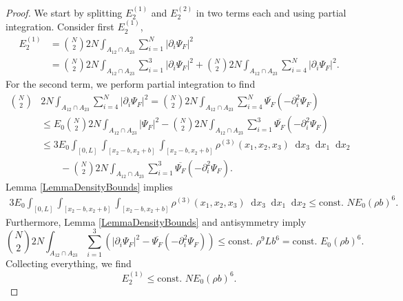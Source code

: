 \documentclass[a4paper,11pt]{article}
\newcommand{\abs}[1]{\left\lvert #1 \right\rvert}
\newcommand*\diff{\mathop{}\!\mathrm{d}}
\numberwithin{equation}{section}
\begin{document}
	\begin{proof}
		We start by splitting $ E_2^{(1)} $ and $ E_2^{(2)} $ in two terms each and using partial integration. Consider first $ E_2^{(1)} $,  
		\begin{equation}
			\begin{aligned}
				E_2^{(1)}&=\binom{N}{2}2N\int_{A_{12}\cap A_{23}}\sum_{i=1}^{N}\abs{\partial_i\Psi_F}^2\\
				&=\binom{N}{2}2N\int_{A_{12}\cap A_{23}}\sum_{i=1}^{3}\abs{\partial_i\Psi_F}^2+\binom{N}{2}2N\int_{A_{12}\cap A_{23}}\sum_{i=4}^{N}\abs{\partial_i\Psi_F}^2.
			\end{aligned}
		\end{equation}
		For the second term, we perform partial integration to find \begin{equation}
			\begin{aligned}
				\binom{N}{2}&2N\int_{A_{12}\cap A_{23}}\sum_{i=4}^{N}\abs{\partial_i\Psi_F}^2=\binom{N}{2}2N\int_{A_{12}\cap A_{23}}\sum_{i=4}^{N}\overline{\Psi_F}(-\partial^2_i\Psi_F)\\
				&\leq E_0 \binom{N}{2}2N\int_{A_{12}\cap A_{23}}\abs{\Psi_F}^2-\binom{N}{2}2N\int_{A_{12}\cap A_{23}}\sum_{i=1}^{3}\overline{\Psi_F}(-\partial^2_i\Psi_F)\\&\leq 3E_0\int_{[0,L]}\int_{[x_2-b,x_2+b]}\int_{[x_2-b,x_2+b]}\rho^{(3)}(x_1,x_2,x_3)\diff x_3\diff x_1\diff x_2\\
				&\qquad  -\binom{N}{2}2N\int_{A_{12}\cap A_{23}}\sum_{i=1}^{3}\overline{\Psi_F}(-\partial^2_i\Psi_F).
			\end{aligned}
		\end{equation}
		Lemma \ref{LemmaDensityBounds} implies \begin{equation}
			\begin{aligned}
				3E_0\int_{[0,L]}\int_{[x_2-b,x_2+b]}\int_{[x_2-b,x_2+b]}\rho^{(3)}(x_1,x_2,x_3)\diff x_3\diff x_1\diff x_2\leq \text{const. }NE_0(\rho b)^6.
			\end{aligned}
		\end{equation}
		Furthermore, Lemma \ref{LemmaDensityBounds} and antisymmetry imply \begin{equation}
			\binom{N}{2}2N\int_{A_{12}\cap A_{23}}\sum_{i=1}^{3}\left(\abs{\partial_i\Psi_F}^2-\overline{\Psi_F}(-\partial^2_i\Psi_F)\right)\leq \text{const. }\rho^9 L b^6=\text{const. }E_0 (\rho b)^6.
		\end{equation}
		Collecting everything, we find \begin{equation}
			E_2^{(1)}\leq \text{const. }NE_0(\rho b)^6.

\end{equation}
\end{proof}
\end{document}
